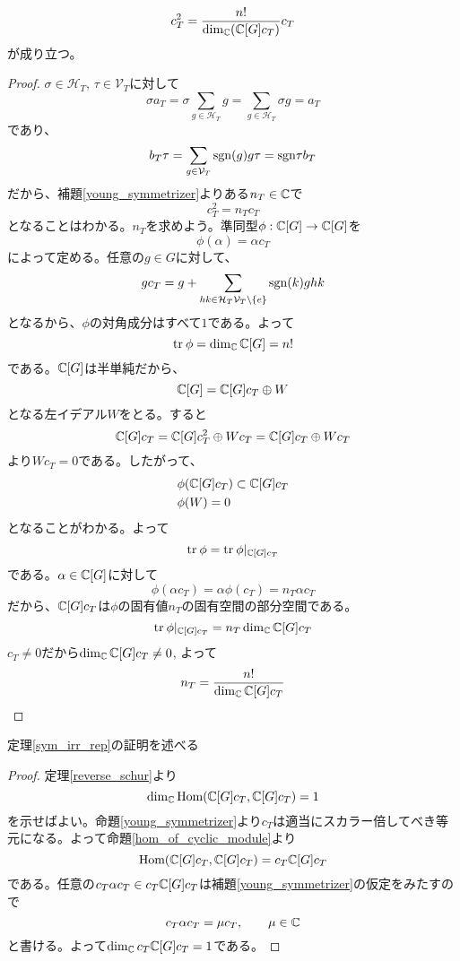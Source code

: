 \documentclass{ltjsarticle}
\begin{document}
\begin{prop}\label{square_of_young_sym}
  \[
  c_T^2=\frac{n!}{\dim_{\mathbb{C}}(\mathbb{C}[G]c_T)}c_T  
  \]
  が成り立つ。
\end{prop}

\begin{proof}
  $\sigma\in\mathcal{H}_T$, $\tau\in\mathcal{V}_T$に対して
  \[
  \sigma a_T=\sigma\sum_{g\in\mathcal{H}_T}g=\sum_{g\in\mathcal{H}_T}\sigma g=a_T  
  \]
  であり、
  \[
  b_T\tau=\sum_{g\in\mathcal{V}_T}\mathrm{sgn}(g)g\tau=\mathrm{sgn}{\tau}b_T  
  \]
  だから、補題\ref{young_symmetrizer}よりある$n_T\in\mathbb{C}$で
  \[
  c_T^2=n_T c_T  
  \]
  となることはわかる。$n_T$を求めよう。準同型$\phi:\mathbb{C}[G]\rightarrow\mathbb{C}[G]$を
  \[
  \phi(\alpha)=\alpha c_T  
  \]
  によって定める。任意の$g\in G$に対して、
  \[
  gc_T=g+\sum_{hk\in\mathcal{H}_T\mathcal{V}_T\setminus\{e\}}\mathrm{sgn}(k)ghk  
  \]
  となるから、$\phi$の対角成分はすべて$1$である。よって
  \[
  \text{tr}\:\phi=\dim_{\mathbb{C}}\mathbb{C}[G]=n!  
  \]
  である。$\mathbb{C}[G]$は半単純だから、
  \[
  \mathbb{C}[G]=\mathbb{C}[G]c_T\oplus W  
  \]
  となる左イデアル$W$をとる。すると
  \[
  \mathbb{C}[G]c_T=\mathbb{C}[G]c_T^2\oplus Wc_T=\mathbb{C}[G]c_T\oplus Wc_T 
  \]
  より$Wc_T=0$である。したがって、
  \begin{align*}
    &\phi(\mathbb{C}[G]c_T)\subset \mathbb{C}[G]c_T\\
    &\phi(W)=0
  \end{align*}
  となることがわかる。よって
  \[
  \text{tr}\:\phi=\text{tr}\:\phi|_{\mathbb{C}[G]c_T}  
  \]
  である。$\alpha\in\mathbb{C}[G]$に対して
  \[
  \phi(\alpha c_T)=\alpha\phi(c_T)=n_T\alpha c_T
  \]
  だから、$\mathbb{C}[G]c_T$は$\phi$の固有値$n_T$の固有空間の部分空間である。
  \[
  \text{tr}\:\phi|_{\mathbb{C}[G]c_T}=n_T\dim_{\mathbb{C}}\mathbb{C}[G]c_T 
  \]
  $c_T\neq 0$だから$\dim_{\mathbb{C}}\mathbb{C}[G]c_T\neq 0$,
  よって
  \[
  n_T=\frac{n!}{\dim_{\mathbb{C}}\mathbb{C}[G]c_T}  
  \]
\end{proof}

定理\ref{sym_irr_rep}の証明を述べる

\begin{proof}
  定理\ref{reverse_schur}より
  \[
  \dim_{\mathbb{C}}\text{Hom}(\mathbb{C}[G]c_T,\mathbb{C}[G]c_T)=1  
  \]
  を示せばよい。命題\ref{young_symmetrizer}より$c_T$は適当にスカラー倍してべき等元になる。よって命題\ref{hom_of_cyclic_module}より
  \[
  \text{Hom}(\mathbb{C}[G]c_T,\mathbb{C}[G]c_T)=c_T\mathbb{C}[G]c_T  
  \]
  である。任意の$c_T\alpha c_T\in c_T\mathbb{C}[G]c_T$は補題\ref{young_symmetrizer}の仮定をみたすので
  \[
    c_T\alpha c_T=\mu c_T,\qquad\mu\in\mathbb{C}
  \]
  と書ける。よって$\dim_{\mathbb{C}} c_T\mathbb{C}[G]c_T=1$である。
\end{proof}
\end{document}
